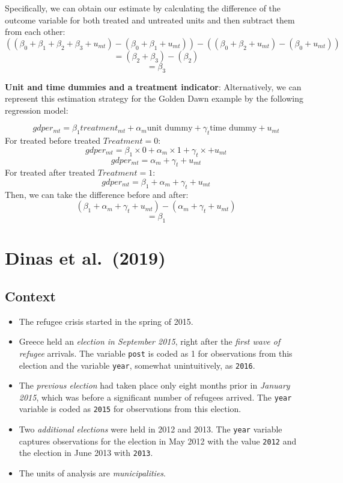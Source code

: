 \documentclass[
]{article}
\providecommand{\tightlist}{%
  \setlength{\itemsep}{0pt}\setlength{\parskip}{0pt}}
\begin{document}
Specifically, we can obtain our estimate by calculating the difference
of the outcome variable for both treated and untreated units and then
subtract them from each other:
\[((\beta_0 + \beta_1  + \beta_2 + \beta_3 + u_{mt}) - (\beta_0 + \beta_1 + u_{mt})) -((\beta_0 + \beta_2 + u_{mt})-(\beta_0 + u_{mt}))\]
\[= (\beta_2 + \beta_3) -(\beta_2)\] \[=\beta_3\]

\textbf{Unit and time dummies and a treatment indicator}: Alternatively,
we can represent this estimation strategy for the Golden Dawn example by
the following regression model:

\[gdper_{mt} =  \beta_1treatment_{mt} + \alpha_m \text{unit dummy} + \gamma_t \text{time dummy} +  u_{mt}\]
For treated before treated \(Treatment = 0\):
\[gdper_{mt} =  \beta_1\times 0 + \alpha_m \times 1 + \gamma_t \times +  u_{mt}\]
\[gdper_{mt} = \alpha_m + \gamma_t + u_{mt}\] For treated after treated
\(Treatment = 1\):
\[gdper_{mt} = \beta_1 +  \alpha_m + \gamma_t + u_{mt}\] Then, we can
take the difference before and after:
\[(\beta_1 +  \alpha_m + \gamma_t + u_{mt}) - (\alpha_m + \gamma_t + u_{mt})\]
\[ = \beta_1\]

\section{Dinas et al.~(2019)}\label{dinas-et-al.-2019}

\subsection{Context}\label{context}

\begin{itemize}
\tightlist
\item
  The refugee crisis started in the spring of 2015.
\item
  Greece held an \emph{election in September 2015}, right after the
  \emph{first wave of refugee} arrivals. The variable \texttt{post} is
  coded as 1 for observations from this election and the variable
  \texttt{year}, somewhat unintuitively, as \texttt{2016}.
\item
  The \emph{previous election} had taken place only eight months prior
  in \emph{January 2015}, which was before a significant number of
  refugees arrived. The \texttt{year} variable is coded as \texttt{2015}
  for observations from this election.
\item
  Two \emph{additional elections} were held in 2012 and 2013. The
  \texttt{year} variable captures observations for the election in May
  2012 with the value \texttt{2012} and the election in June 2013 with
  \texttt{2013}.
\item
  The units of analysis are \emph{municipalities}.
\end{itemize}
\end{document}
